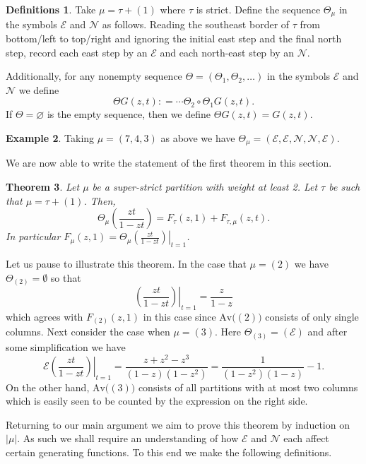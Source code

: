 \documentclass{article}
\theoremstyle{plain}
\newtheorem{theorem}{Theorem}[section]
\theoremstyle{definition}
\newtheorem{definitions}[theorem]{Definitions}
\newtheorem{example}[theorem]{Example}
\newcommand{\Av}{\text{Av}}
\newcommand{\N}{\mathcal{N}}
\newcommand{\E}{\mathcal{E}}
\begin{document}
\begin{definitions}
Take $\mu = \tau+(1)$ where $\tau$ is strict. Define the sequence $\Theta_\mu$ in the symbols $\E$ and $\N$ as follows.  Reading the southeast border of $\tau$ from bottom/left to top/right and ignoring the initial east step and the final north step, record each east step by an $\E$ and each north-east step by an $\N$.  

Additionally, for any nonempty sequence $\Theta=(\Theta_1,\Theta_2,\ldots)$ in the symbols $\E$ and $\N$ we define
$$\Theta G(z,t): = \cdots \Theta_2\circ \Theta_1 G(z,t).$$
If $\Theta = \varnothing$ is the empty sequence, then we define $\Theta G(z,t) = G(z,t)$.
\end{definitions}

\begin{example}
Taking $\mu=(7,4,3)$ as above we have $\Theta_\mu = (\E, \E, \N,\N,\E)$.
\end{example}


We are now able to write the statement of the first theorem in this section.  

\begin{theorem}\label{thm:F}
Let $\mu$ be a super-strict partition with weight at least 2.  Let $\tau$ be such that $\mu=\tau+(1)$.  Then,
$$\Theta_\mu\left(\frac{zt}{1-zt}\right) =F_{\tau}(z,1) + F_{\tau,\mu}(z,t).$$
In particular $F_\mu(z,1) = \left.\Theta_\mu\left(\frac{zt}{1-zt}\right)\right|_{t=1}$.  
\end{theorem}

Let us pause to illustrate this theorem.  In the case that $\mu=(2)$ we have $\Theta_{(2)} = \emptyset$  so that 
$$\left.\left(\frac{zt}{1-zt}\right)\right|_{t=1} = \frac{z}{1-z}$$
which agrees with $F_{(2)}(z,1)$ in this case since $\Av\big((2)\big)$ consists of only single columns.   Next consider the case when $\mu = (3)$.  Here $\Theta_{(3)} = (\E)$ and  after some simplification we have
$$\E \left.\left(\frac{zt}{1-zt}\right)\right|_{t=1} = \frac{z+z^2 - z^3}{(1-z)(1-z^2)}= \frac{1}{(1-z^2)(1-z)}-1.$$
On the other hand, $\Av\big((3)\big)$ consists of all partitions with at most two columns which is easily seen to be counted by the expression on the right side.  

Returning to our main argument we aim to prove this theorem by induction on $|\mu|$.  As such  we shall require an understanding of how $\E$ and $\N$ each affect certain generating functions.  To this end we make the following definitions.
\end{document}
